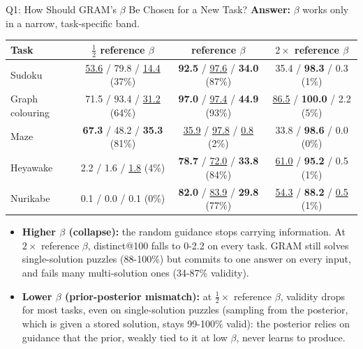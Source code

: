 \documentclass[aspectratio=169,10pt]{beamer}
\newcommand{\secbest}[1]{\underline{#1}}
\begin{document}
\begin{frame}{Q1: How Should GRAM's $\beta$ Be Chosen for a New Task?}
  \textbf{Answer:} $\beta$ works only in a narrow, task-specific band.

  \vspace{0.4em}
  \centering
  \footnotesize
  \begin{tabular}{@{}lccc@{}}
    \toprule
    \textbf{Task} & \textbf{$\frac{1}{2}$ reference $\beta$} & \textbf{reference $\beta$} & \textbf{$2\times$ reference $\beta$} \\
    \midrule
    Sudoku & \secbest{53.6} / 79.8 / \secbest{14.4} (37\%) & \textbf{92.5} / \secbest{97.6} / \textbf{34.0} (87\%) & 35.4 / \textbf{98.3} / 0.3 (1\%) \\
    Graph colouring & 71.5 / 93.4 / \secbest{31.2} (64\%) & \textbf{97.0} / \secbest{97.4} / \textbf{44.9} (93\%) & \secbest{86.5} / \textbf{100.0} / 2.2 (5\%) \\
    Maze & \textbf{67.3} / 48.2 / \textbf{35.3} (81\%) & \secbest{35.9} / \secbest{97.8} / \secbest{0.8} (2\%) & 33.8 / \textbf{98.6} / 0.0 (0\%) \\
    Heyawake & 2.2 / 1.6 / \secbest{1.8} (4\%) & \textbf{78.7} / \secbest{72.0} / \textbf{33.8} (84\%) & \secbest{61.0} / \textbf{95.2} / 0.5 (1\%) \\
    Nurikabe & 0.1 / 0.0 / 0.1 (0\%) & \textbf{82.0} / \secbest{83.9} / \textbf{29.8} (77\%) & \secbest{54.3} / \textbf{88.2} / \secbest{0.5} (1\%) \\
    \bottomrule
  \end{tabular}

  \vspace{0.6em}
  \raggedright\small
    \begin{itemize}\setlength{\itemsep}{0.5em}
    \item \textbf{Higher $\beta$ (collapse):} the random guidance stops carrying information. At $2\times$ reference $\beta$, distinct@100 falls to 0-2.2 on every task. GRAM still solves single-solution puzzles (88-100\%) but commits to one answer on every input, and fails many multi-solution ones (34-87\% validity).
    \item \textbf{Lower $\beta$ (prior-posterior mismatch):} at $\frac{1}{2}\times$ reference $\beta$, validity drops for most tasks, even on single-solution puzzles (sampling from the posterior, which is given a stored solution, stays 99-100\% valid): the posterior relies on guidance that the prior, weakly tied to it at low $\beta$, never learns to produce.
    \end{itemize}
\end{frame}
\end{document}
